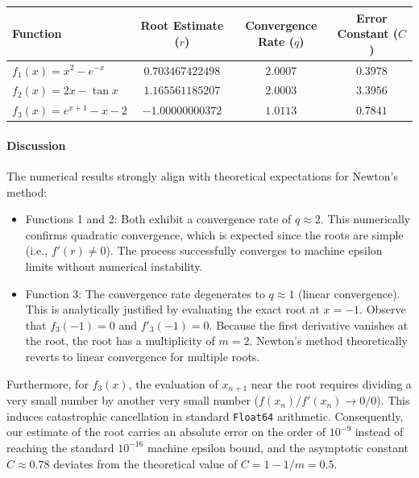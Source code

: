 \begin{solution}
	\begin{center}
		\centering
		\label{tab:newton_results}
		\renewcommand{\arraystretch}{1.2}
		\begin{tabular}{l c c c}
			\toprule
			Function          & Root Estimate ($r$) & Convergence Rate ($q$) & Error Constant ($C$) \\
			\midrule
			$f_1(x) = x^2 - e^{-x}$    & $0.703467422498$             & $2.0007$                        & $0.3978$                      \\
			$f_2(x) = 2x - \tan x$     & $1.165561185207$             & $2.0003$                        & $3.3956$                      \\
			$f_3(x) = e^{x+1} - x - 2$ & $-1.00000000372$             & $1.0113$                        & $0.7841$                      \\
			\bottomrule
		\end{tabular}
	\end{center}

	\paragraph{Discussion}
	The numerical results strongly align with theoretical expectations for Newton's method:
	\begin{itemize}
		\item Functions 1 and 2: Both exhibit a convergence rate of $q
			      \approx 2$. This numerically confirms quadratic convergence, which is
		      expected since the roots are simple (i.e., $f'(r) \neq 0$). The process
		      successfully converges to machine epsilon limits without numerical
		      instability.
		\item Function 3: The convergence rate degenerates to $q
			      \approx 1$ (linear convergence). This is analytically justified by
		      evaluating the exact root at $x = -1$. Observe that $f_3(-1) = 0$ and
		      $f'_3(-1) = 0$. Because the first derivative vanishes at the root, the
		      root has a multiplicity of $m=2$. Newton's method theoretically reverts
		      to linear convergence for multiple roots.
	\end{itemize}
	Furthermore, for $f_3(x)$, the evaluation of $x_{n+1}$ near the root
	requires dividing a very small number by another very small number
	($f(x_n)/f'(x_n) \to 0/0$). This induces catastrophic cancellation in
	standard \texttt{Float64} arithmetic. Consequently, our estimate of the root
	carries an absolute error on the order of $10^{-9}$ instead of reaching the
	standard $10^{-16}$ machine epsilon bound, and the asymptotic constant $C
		\approx 0.78$ deviates from the theoretical value of $C = 1 - 1/m = 0.5$.


\end{solution}
